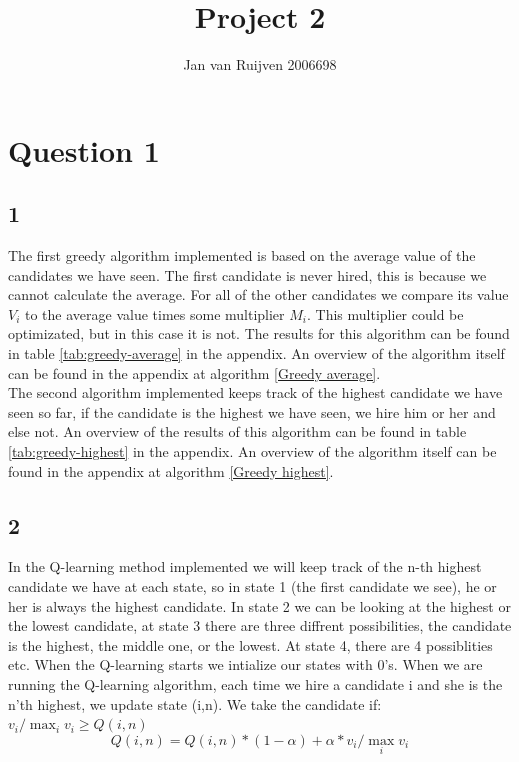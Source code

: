 \documentclass{article}
\title{Project 2}
\author{Jan van Ruijven 2006698}
\begin{document}
\maketitle %

\section*{Question 1}
\subsection*{1}
The first greedy algorithm implemented is based on the average value of the candidates we have seen. The first candidate is never hired, this is because we cannot calculate the average. For all of the other candidates we compare its value $V_i$ to the average value times some multiplier $M_i$. This multiplier could be optimizated, but in this case it is not. The results for this algorithm can be found in table \ref{tab:greedy-average} in the appendix. An overview of the algorithm itself can be found in the appendix at algorithm \ref{Greedy average}. \\ 
The second algorithm implemented keeps track of the highest candidate we have seen so far, if the candidate is the highest we have seen, we hire him or her and else not. An overview of the results of this algorithm can be found in table \ref{tab:greedy-highest} in the appendix. An overview of the algorithm itself can be found in the appendix at algorithm \ref{Greedy highest}. 
\subsection*{2}
In the Q-learning method implemented we will keep track of the n-th highest candidate we have at each state, so in state 1 (the first candidate we see), he or her is always the highest candidate. In state 2 we can be looking at the highest or the lowest candidate, at state 3 there are three diffrent possibilities, the candidate is the highest, the middle one, or the lowest. At state 4, there are 4 possiblities etc. When the Q-learning starts we intialize our states with 0's. When we are running the Q-learning algorithm, each time we hire a candidate i and she is the n'th highest, we update state (i,n). We take the candidate if: $v_i / \max_{i} v_i \geq Q(i, n)$
\begin{equation}
	Q(i, n) = Q(i, n) * (1-\alpha) + \alpha * v_i / \max_{i} v_i 	
	\label{eq:State-Update Ex1}
\end{equation}
\end{document}
